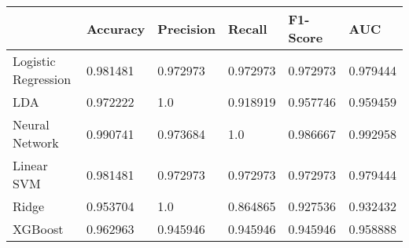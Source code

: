 \begin{tabular}{llllll}
\toprule
{} &  Accuracy & Precision &    Recall &  F1-Score &       AUC \\
\midrule
Logistic Regression &  0.981481 &  0.972973 &  0.972973 &  0.972973 &  0.979444 \\
LDA                 &  0.972222 &       1.0 &  0.918919 &  0.957746 &  0.959459 \\
Neural Network      &  0.990741 &  0.973684 &       1.0 &  0.986667 &  0.992958 \\
Linear SVM          &  0.981481 &  0.972973 &  0.972973 &  0.972973 &  0.979444 \\
Ridge               &  0.953704 &       1.0 &  0.864865 &  0.927536 &  0.932432 \\
XGBoost             &  0.962963 &  0.945946 &  0.945946 &  0.945946 &  0.958888 \\
\bottomrule
\end{tabular}
